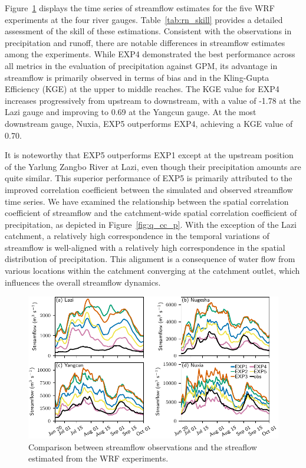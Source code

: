 \documentclass[draft]{agujournal2019}
\begin{document}
Figure~\ref{fig:q_opt} displays the time series of streamflow estimates for the five WRF experiments at the four river gauges. Table~\ref{tab:rn_skill} provides a detailed assessment of the skill of these estimations. Consistent with the observations in precipitation and runoff, there are notable differences in streamflow estimates among the experiments. While EXP4 demonstrated the best performance across all metrics in the evaluation of precipitation against GPM, its advantage in streamflow is primarily observed in terms of bias and in the Kling-Gupta Efficiency (KGE) at the upper to middle reaches. The KGE value for EXP4 increases progressively from upstream to downstream, with a value of -1.78 at the Lazi gauge and improving to 0.69 at the Yangcun gauge. At the most downstream gauge, Nuxia, EXP5 outperforms EXP4, achieving a KGE value of 0.70.

It is noteworthy that EXP5 outperforms EXP1 except at the upstream position of the Yarlung Zangbo River at Lazi, even though their precipitation amounts are quite similar. This superior performance of EXP5 is primarily attributed to the improved correlation coefficient between the simulated and observed streamflow time series. We have examined the relationship between the spatial correlation coefficient of streamflow and the catchment-wide spatial correlation coefficient of precipitation, as depicted in Figure~\ref{fig:q_cc_p}. With the exception of the Lazi catchment, a relatively high correspondence in the temporal variations of streamflow is well-aligned with a relatively high correspondence in the spatial distribution of precipitation. This alignment is a consequence of water flow from various locations within the catchment converging at the catchment outlet, which influences the overall streamflow dynamics.

\begin{figure}[h!]
      \centering
      \noindent\includegraphics[width=140mm]{q_opt.pdf}
      \caption{Comparison between streamflow observations and the streaflow estimated from the WRF experiments. \label{fig:q_opt}}
\end{figure}
\end{document}
